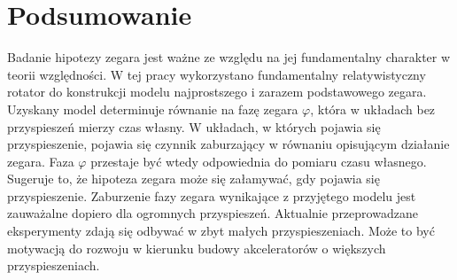 \section{Podsumowanie}
Badanie hipotezy zegara jest ważne ze względu na jej 
fundamentalny charakter w teorii względności. 
W tej pracy wykorzystano fundamentalny relatywistyczny rotator 
do konstrukcji modelu najprostszego i zarazem podstawowego 
zegara. Uzyskany model determinuje równanie na fazę zegara $\varphi$,
która w układach bez przyspieszeń mierzy czas własny. 
W układach, w których pojawia się przyspieszenie, pojawia się
czynnik zaburzający w równaniu opisującym działanie zegara. 
Faza $\varphi$ przestaje być wtedy odpowiednia do pomiaru 
 czasu własnego. Sugeruje to, że hipoteza zegara może 
się załamywać, gdy pojawia się przyspieszenie. 
Zaburzenie fazy zegara wynikające z przyjętego modelu
 jest zauważalne dopiero dla
 ogromnych przyspieszeń.
Aktualnie przeprowadzane eksperymenty zdają się odbywać w zbyt małych 
przyspieszeniach. Może to być motywacją do rozwoju w kierunku 
budowy akceleratorów o większych przyspieszeniach.
